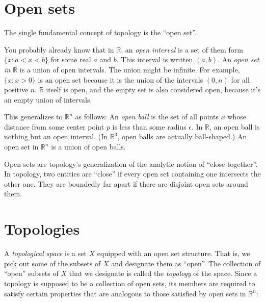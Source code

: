 \documentclass{article}
\def\R{{\mathbb R}}
\def\Rn{{\R^n}}
\begin{document}
\section*{Open sets}

The single fundamental concept of topology is the ``open set''.

You probably already know that in $\R$, an {\em open interval} is a set
of them form $\{x : a < x < b \}$ for some real $a$ and $b$.  This
interval is written $(a, b)$.  An {\em open set in $\R$} is a union of
open intervals.  The union might be infinite.  For example, $\{ x : x
> 0 \}$ is an open set because it is the union of the intervals $(0,
n)$ for all positive $n$.  $\R$ itself is open, and the empty set is
also considered open, because it's an empty union of intervals.

This generalizes to $\Rn$ as follows: An {\em open ball\/} is the set
of all points $x$ whose distance from some center point $p$ is less
than some radius $\epsilon$.  In $\R$, an open ball is nothing but an
open interval.  (In $\R^3$, open balls are actually ball-shaped.)  An
open set in $\Rn$ is a union of open balls.


Open sets are topology's generalization of the analytic notion of
``close together''.  In topology, two entities are ``close'' if every
open set containing one intersects the other one.  They are boundedly
far apart if there are disjoint open sets around them.

\section*{Topologies}

A {\em topological space\/} is a set $X$ equipped with an open set
structure.  That is, we pick out some of the subsets of $X$ and
designate them as ``open''.  The collection of ``open'' subsets of $X$
that we designate is called the {\em topology\/} of the space.
Since a topology is supposed to be a collection of open sets, its
members are required to satisfy certain properties that are analogous
to those satisfied by open sets in $\Rn$:
\end{document}
